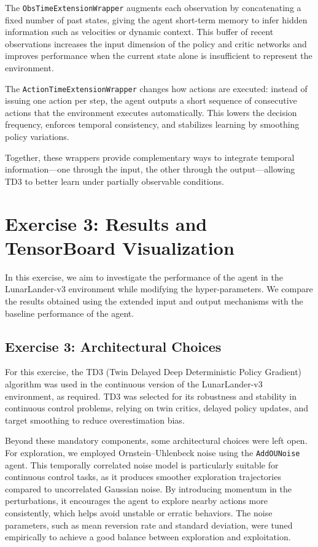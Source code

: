 \documentclass[12pt, a4paper]{article}
\begin{document}
The \texttt{ObsTimeExtensionWrapper} augments each observation by concatenating a fixed number of past states, giving the agent short-term memory to infer hidden information such as velocities or dynamic context. This buffer of recent observations increases the input dimension of the policy and critic networks and improves performance when the current state alone is insufficient to represent the environment.

The \texttt{ActionTimeExtensionWrapper} changes how actions are executed: instead of issuing one action per step, the agent outputs a short sequence of consecutive actions that the environment executes automatically. This lowers the decision frequency, enforces temporal consistency, and stabilizes learning by smoothing policy variations.

Together, these wrappers provide complementary ways to integrate temporal information—one through the input, the other through the output—allowing TD3 to better learn under partially observable conditions.


\section{Exercise 3: Results and TensorBoard Visualization}

In this exercise, we aim to investigate the performance of the agent in the LunarLander-v3 environment while modifying the hyper-parameters. We compare the results obtained using the extended input and output mechanisms with the baseline performance of the agent.

\subsection{Exercise 3: Architectural Choices}

For this exercise, the TD3 (Twin Delayed Deep Deterministic Policy Gradient) algorithm was used in the continuous version of the LunarLander-v3 environment, as required. TD3 was selected for its robustness and stability in continuous control problems, relying on twin critics, delayed policy updates, and target smoothing to reduce overestimation bias.

Beyond these mandatory components, some architectural choices were left open. For exploration, we employed Ornstein–Uhlenbeck noise using the \texttt{AddOUNoise} agent. This temporally correlated noise model is particularly suitable for continuous control tasks, as it produces smoother exploration trajectories compared to uncorrelated Gaussian noise. By introducing momentum in the perturbations, it encourages the agent to explore nearby actions more consistently, which helps avoid unstable or erratic behaviors. The noise parameters, such as mean reversion rate and standard deviation, were tuned empirically to achieve a good balance between exploration and exploitation.
\end{document}
